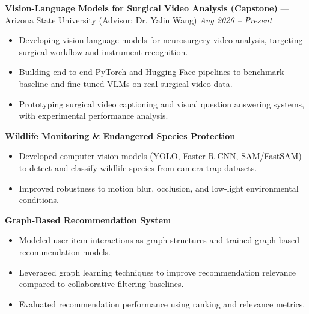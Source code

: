 \documentclass[a4paper,8pt]{extarticle}
\begin{document}
\noindent
\textbf{Vision-Language Models for Surgical Video Analysis (Capstone)} --- Arizona State University (Advisor: Dr. Yalin Wang)
\hfill \textit{Aug 2026 -- Present}

\begin{itemize}
\item Developing vision-language models for neurosurgery video analysis, targeting surgical workflow and instrument recognition.
\item Building end-to-end PyTorch and Hugging Face pipelines to benchmark baseline and fine-tuned VLMs on real surgical video data.
\item Prototyping surgical video captioning and visual question answering systems, with experimental performance analysis.
\end{itemize}

\noindent
\textbf{Wildlife Monitoring \& Endangered Species Protection}

\begin{itemize}
\item Developed computer vision models (YOLO, Faster R-CNN, SAM/FastSAM) to detect and classify wildlife species from camera trap datasets.
\item Improved robustness to motion blur, occlusion, and low-light environmental conditions.
\end{itemize}

\noindent
\textbf{Graph-Based Recommendation System}

\begin{itemize}
\item Modeled user-item interactions as graph structures and trained graph-based recommendation models.
\item Leveraged graph learning techniques to improve recommendation relevance compared to collaborative filtering baselines.
\item Evaluated recommendation performance using ranking and relevance metrics.
\end{itemize}
\end{document}
